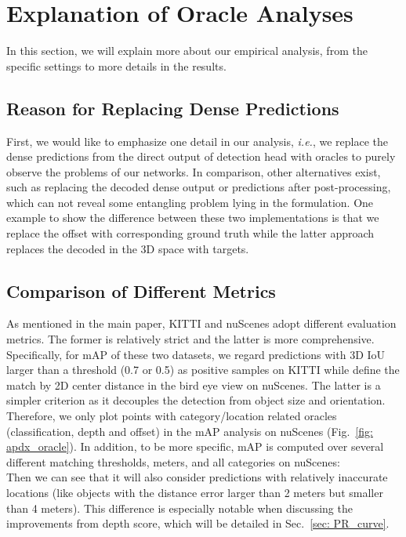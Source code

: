 \section{Explanation of Oracle Analyses}
In this section, we will explain more about our empirical analysis, from the specific settings to more details in the results.

\subsection{Reason for Replacing Dense Predictions}
First, we would like to emphasize one detail in our analysis, \emph{i.e.}, we replace the dense predictions from the direct output of detection head with oracles to purely observe the problems of our networks. In comparison, other alternatives exist, such as replacing the decoded dense output or predictions after post-processing, which can not reveal some entangling problem lying in the formulation. One example to show the difference between these two implementations is that we replace the offset with corresponding ground truth while the latter approach replaces the decoded  in the 3D space with targets.

\subsection{Comparison of Different Metrics}
As mentioned in the main paper, KITTI and nuScenes adopt different evaluation metrics. The former is relatively strict and the latter is more comprehensive. Specifically, for mAP of these two datasets, we regard predictions with 3D IoU larger than a threshold (0.7 or 0.5) as positive samples on KITTI while define the match by 2D center distance  in the bird eye view on nuScenes. The latter is a simpler criterion as it decouples the detection from object size and orientation. Therefore, we only plot points with category/location related oracles (classification, depth and offset) in the mAP analysis on nuScenes (Fig.~\ref{fig: apdx_oracle}). In addition, to be more specific, mAP is computed over several different matching thresholds,  meters, and all categories  on nuScenes:\\

Then we can see that it will also consider predictions with relatively inaccurate locations (like objects with the distance error larger than 2 meters but smaller than 4 meters). This difference is especially notable when discussing the improvements from depth score, which will be detailed in Sec.~\ref{sec: PR_curve}.

